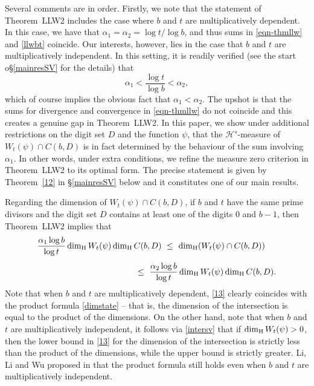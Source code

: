 \documentclass[12pt]{article}
\theoremstyle{definition}
\theoremstyle{remark}
\begin{document}
Several comments are in order.    Firstly, we note that the  statement of Theorem~LLW2 includes the  case where  $b$ and $t$ are multiplicatively dependent. In this case, we have that  $ \alpha_1=  \alpha_2 =  \log t/\log b $,  and thus  sums in \eqref{eqn-thmllw} and  \eqref{llwbt} coincide.   Our interests, however, lies  in the case that $b$ and $t$ are multiplicatively independent.  In this setting,  it is readily verified (see the start o\S\ref{mainresSV} for the details) that
\begin{equation}\label{intersv}
  \alpha_1<\frac{\log t}{\log b}<\alpha_2,
\end{equation}
 which  of course implies the obvious  fact  that $ \alpha_1   <   \alpha_2 $.  The upshot is that the sums for divergence and convergence  in \eqref{eqn-thmllw} do not coincide and this creates a  genuine gap in  Theorem~LLW2. In this paper, we show under additional  restrictions on the digit set $D$ and the function $\psi$, that the $\mathcal{H}^{s}$-measure of $W_{t}(\psi)\cap C(b,D)$ is in fact determined by the behaviour of the  sum involving $\alpha_1$. In other words, under extra conditions,  we refine the  measure zero criterion in Theorem~LLW2  to its optimal form.  The precise statement is given by  Theorem~\ref{12} in \S\ref{mainresSV} below and it constitutes one of our main results.

 Regarding the dimension of  $W_{t}(\psi)\cap C(b,D)$,  if  $b$ and $t$ have the same prime divisors  and the digit set $D$ contains at least one of the digits $0$ and $b-1$,  then  Theorem~LLW2 implies   that
\begin{equation}\label{13}
\begin{aligned}
\frac{\alpha_{1}\log b}{\log t}\dim_{\rm H}W_{t}(\psi)\dim_{\rm H}C(b,D)&  \ \le \   \dim_{\rm H}(W_{t}(\psi)\cap C(b,D)) \\[1ex]
&~\hspace{-8ex}\le  \ \frac{\alpha_{2}\log b}{\log t}\dim_{\rm H}W_{t}(\psi)\dim_{\rm H}C(b,D).
\end{aligned}
\end{equation}
Note that when $b$ and $t$ are  multiplicatively dependent, \eqref{13} clearly coincides with the product formula \eqref{dimstate}  --  that is, the  dimension of the intersection is equal to the product of the dimensions.   On the other hand, note  that when $b$ and $t$ are multiplicatively independent, it  follows  via \eqref{intersv} that if  $\dim_{\rm H}W_{t}(\psi)>0$, then the  lower  bound  in  \eqref{13} for the  dimension of the intersection is strictly less than  the product of the dimensions, while the upper bound is strictly greater.
 Li, Li and Wu proposed in  \cite[Conjecture 6.3]{LLW2025} that the product formula still holds even when  $b$ and $t$ are multiplicatively independent.
\end{document}
